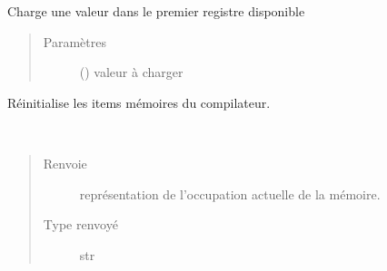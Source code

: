 \documentclass[letterpaper,10pt,french]{sphinxmanual}
\begin{document}
\begin{fulllineitems}
\begin{fulllineitems}
\label{\detokenize{compileexpressionmanager:compileexpressionmanager.CompileExpressionManager.pushValue}}
Charge une valeur dans le premier registre disponible
\begin{quote}\begin{description}
\item[{Paramètres}] \leavevmode
{} (\sphinxstyleliteralemphasis{\sphinxupquote{{[}}}{\hyperref[\detokenize{litteral:litteral.Litteral}]{\sphinxcrossref{\sphinxstyleliteralemphasis{\sphinxupquote{Litteral}}}}}\sphinxstyleliteralemphasis{\sphinxupquote{{]}}}) \textendash{} valeur à charger

\end{description}\end{quote}

\end{fulllineitems}


\begin{fulllineitems}
\label{\detokenize{compileexpressionmanager:compileexpressionmanager.CompileExpressionManager.resetMemory}}
Réinitialise les items mémoires du compilateur.

\end{fulllineitems}


\begin{fulllineitems}
\label{\detokenize{compileexpressionmanager:compileexpressionmanager.CompileExpressionManager.stringMemoryUsage}}~\begin{quote}\begin{description}
\item[{Renvoie}] \leavevmode
représentation de l’occupation actuelle de la mémoire.

\item[{Type renvoyé}] \leavevmode
str

\end{description}\end{quote}

\end{fulllineitems}


\end{fulllineitems}
\end{document}
